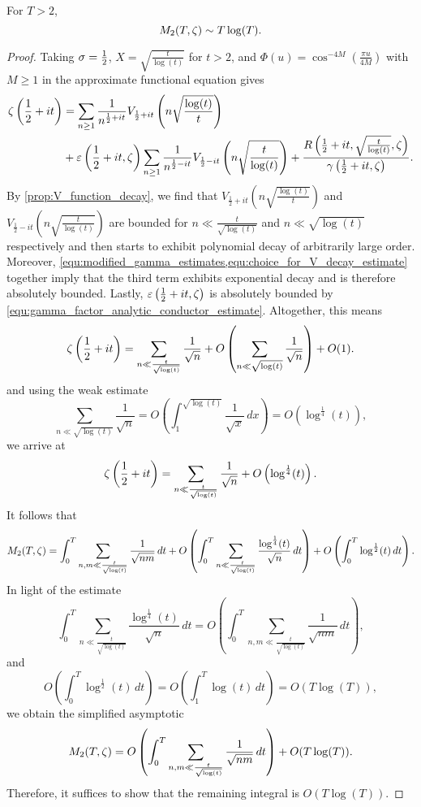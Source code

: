     \begin{theorem}
      For $T > 2$,
      \[
        M_{2}(T,\zeta) \sim T\log(T).
      \]
    \end{theorem}
    \begin{proof}
      Taking $\sigma = \frac{1}{2}$, $X = \sqrt{\frac{t}{\log(t)}}$ for $t > 2$, and $\Phi(u) = \cos^{-4M}\left(\frac{\pi u}{4M}\right)$ with $M \ge 1$ in the approximate functional equation gives
      \begin{align*}
        \zeta\left(\frac{1}{2}+it\right) &= \sum_{n \ge 1}\frac{1}{n^{\frac{1}{2}+it}}V_{\frac{1}{2}+it}\left(n\sqrt{\frac{\log(t)}{t}}\right) \\
        &+ \varepsilon\left(\frac{1}{2}+it,\zeta\right)\sum_{n \ge 1}\frac{1}{n^{\frac{1}{2}-it}}V_{\frac{1}{2}-it}\left(n\sqrt{\frac{t}{\log(t)}}\right)+\frac{R\left(\frac{1}{2}+it,\sqrt{\frac{t}{\log(t)}},\zeta\right)}{\gamma\left(\frac{1}{2}+it,\zeta\right)}.
      \end{align*}
      By \cref{prop:V_function_decay}, we find that $V_{\frac{1}{2}+it}\left(n\sqrt{\frac{\log(t)}{t}}\right)$ and $V_{\frac{1}{2}-it}\left(n\sqrt{\frac{t}{\log(t)}}\right)$ are bounded for $n \ll \frac{t}{\sqrt{\log(t)}}$ and $n \ll \sqrt{\log(t)}$ respectively and then starts to exhibit polynomial decay of arbitrarily large order. Moreover, \cref{equ:modified_gamma_estimates,equ:choice_for_V_decay_estimate} together imply that the third term exhibits exponential decay and is therefore absolutely bounded. Lastly, $\varepsilon\left(\frac{1}{2}+it,\zeta\right)$ is absolutely bounded by \cref{equ:gamma_factor_analytic_conductor_estimate}. Altogether, this means
      \[
        \zeta\left(\frac{1}{2}+it\right) = \sum_{n \ll \frac{t}{\sqrt{\log(t)}}}\frac{1}{\sqrt{n}}+O\left(\sum_{n \ll \sqrt{\log(t)}}\frac{1}{\sqrt{n}}\right)+O(1).
      \]
      and using the weak estimate
      \[
        \sum_{n \ll \sqrt{\log(t)}}\frac{1}{\sqrt{n}} = O\left(\int_{1}^{\sqrt{\log(t)}}\frac{1}{\sqrt{x}}\,dx\right) = O\left(\log^{\frac{1}{4}}(t)\right),
      \]
      we arrive at
      \[
        \zeta\left(\frac{1}{2}+it\right) = \sum_{n \ll \frac{t}{\sqrt{\log(t)}}}\frac{1}{\sqrt{n}}+O\left(\log^{\frac{1}{4}}(t)\right).
      \]
      It follows that
      \[
        M_{2}(T,\zeta) = \int_{0}^{T}\sum_{n,m \ll \frac{t}{\sqrt{\log(t)}}}\frac{1}{\sqrt{nm}}\,dt+O\left(\int_{0}^{T}\sum_{n \ll \frac{t}{\sqrt{\log(t)}}}\frac{\log^{\frac{1}{4}}(t)}{\sqrt{n}}\,dt\right)+O\left(\int_{0}^{T}\log^{\frac{1}{2}}(t)\,dt\right).
      \]
      In light of the estimate
      \[
        \int_{0}^{T}\sum_{n \ll \frac{t}{\sqrt{\log(t)}}}\frac{\log^{\frac{1}{4}}(t)}{\sqrt{n}}\,dt = O\left(\int_{0}^{T}\sum_{n,m \ll \frac{t}{\sqrt{\log(t)}}}\frac{1}{\sqrt{nm}}\,dt\right),
      \]
      and
      \[
        O\left(\int_{0}^{T}\log^{\frac{1}{2}}(t)\,dt\right) = O\left(\int_{1}^{T}\log(t)\,dt\right) = O(T\log(T)),
      \]
      we obtain the simplified asymptotic
      \[
        M_{2}(T,\zeta) = O\left(\int_{0}^{T}\sum_{n,m \ll \frac{t}{\sqrt{\log(t)}}}\frac{1}{\sqrt{nm}}\,dt\right)+O(T\log(T)).
      \]
      Therefore, it suffices to show that the remaining integral is $O(T\log(T))$. 
    \end{proof}